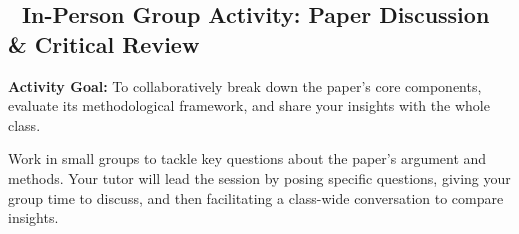 \documentclass[
  letterpaper,
  DIV=11,
  numbers=noendperiod]{scrartcl}
\begin{document}
\subsection{\texorpdfstring{👥 \textbf{In-Person Group Activity: Paper
Discussion \& Critical
Review}}{👥 In-Person Group Activity: Paper Discussion \& Critical Review}}\label{in-person-group-activity-paper-discussion-critical-review}

\textbf{Activity Goal:} To collaboratively break down the paper's core
components, evaluate its methodological framework, and share your
insights with the whole class.

Work in small groups to tackle key questions about the paper's argument
and methods. Your tutor will lead the session by posing specific
questions, giving your group time to discuss, and then facilitating a
class-wide conversation to compare insights.
\end{document}
